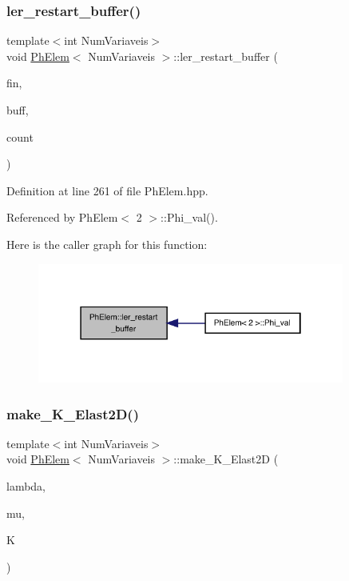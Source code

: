 \subsubsection{\texorpdfstring{ler\+\_\+restart\+\_\+buffer()}{ler\_restart\_buffer()}}
{\footnotesize\ttfamily template$<$int Num\+Variaveis$>$ \\
void \hyperlink{classPhElem}{Ph\+Elem}$<$ Num\+Variaveis $>$\+::ler\+\_\+restart\+\_\+buffer (\begin{DoxyParamCaption}\item[{F\+I\+LE $\ast$}]{fin,  }\item[{double $\ast$}]{buff,  }\item[{int \&}]{count }\end{DoxyParamCaption})}



Definition at line 261 of file Ph\+Elem.\+hpp.



Referenced by Ph\+Elem$<$ 2 $>$\+::\+Phi\+\_\+val().

Here is the caller graph for this function\+:
\nopagebreak
\begin{figure}[H]
\begin{center}
\leavevmode
\includegraphics[width=286pt]{classPhElem_ad0a2992e6d206b6a351da8847a9dd69a_icgraph}
\end{center}
\end{figure}
\mbox{\label{classPhElem_ac59f1cbe0962524e3aa5eced9a4393f6}} 
\subsubsection{\texorpdfstring{make\+\_\+\+K\+\_\+\+Elast2\+D()}{make\_K\_Elast2D()}}
{\footnotesize\ttfamily template$<$int Num\+Variaveis$>$ \\
void \hyperlink{classPhElem}{Ph\+Elem}$<$ Num\+Variaveis $>$\+::make\+\_\+\+K\+\_\+\+Elast2D (\begin{DoxyParamCaption}\item[{const double}]{lambda,  }\item[{const double}]{mu,  }\item[{double $\ast$$\ast$}]{K }\end{DoxyParamCaption})}



